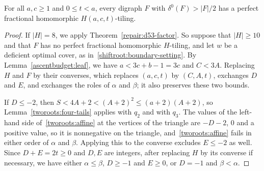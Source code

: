 \begin{theorem}
\label{rottriangle:all-single-middle}
For all $a,c\ge1$ and $0\le t<a$, every digraph $F$ with $\delta^0(F)>|F|/2$ has a perfect
fractional homomorphic $H(a,c,t)$-tiling.
\end{theorem}
\begin{proof}
If $|H|=8$, we apply Theorem~\ref{repair:d53-factor}. So suppose that $|H|\ge10$ and that $F$ has no perfect fractional homomorphic $H$-tiling, and let $w$ be a deficient optimal cover, as in~\eqref{shiftroot:boundary-setting}. By Lemma~\ref{ascentbudget:leaf}, we have $a<3c+b-1=3c$
and $C<3A$. Replacing $H$ and $F$ by their converses, which replaces $(a,c,t)$ by $(C,A,t)$, exchanges $D$ and $E$, and exchanges the roles of $\alpha$ and $\beta$; it also preserves these two bounds.

If $D\le-2$, then $S<4A+2<(A+2)^2\le(a+2)(A+2)$, so
Lemma~\ref{tworoots:four-tails} applies with $q_2$ and with $q_3$. The values of the left-hand side of~\eqref{tworoots:affine} at the vertices of the triangle are
$-D-2$, $0$ and a positive value, so it is nonnegative on the triangle, and~\eqref{tworoots:affine} fails in either order of $\alpha$ and $\beta$. Applying this to the converse excludes $E\le-2$ as well.
Since $D+E=2t\ge0$ and $D,E$ are integers, after replacing $H$ by its converse if necessary, we have either $\alpha\le\beta$, $D\ge-1$ and $E\ge0$, or $D=-1$ and $\beta<\alpha$.


\end{proof}
